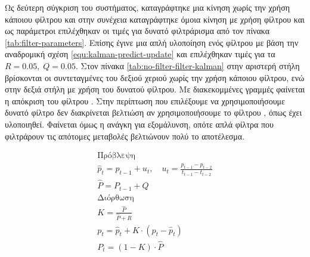 Ως δεύτερη σύγκριση του συστήματος, καταγράφτηκε μια κίνηση χωρίς την χρήση κάποιου φίλτρου και στην συνέχεια καταγράφτηκε όμοια κίνηση με χρήση φίλτρου και ως παράμετροι επιλέχθηκαν οι τιμές για δυνατό φιλτράρισμα από τον πίνακα \ref{tab:filter-parameters}. Επίσης έγινε μια απλή υλοποίηση ενός φίλτρου  με βάση την αναδρομική σχέση \ref{equ:kalman-predict-update} και επιλέχθηκαν τιμές για τα $R = 0.05,\; Q = 0.05$. Στον πίνακα \ref{tab:no-filter-filter-kalman} στην αριστερή στήλη βρίσκονται οι συντεταγμένες του δεξιού χεριού χωρίς την χρήση κάποιου φίλτρου, ενώ στην δεξιά στήλη με χρήση του δυνατού φίλτρου. Με διακεκομμένες γραμμές φαίνεται η απόκριση του φίλτρου . Στην περίπτωση που επιλέξουμε να χρησιμοποιήσουμε δυνατό φίλτρο δεν διακρίνεται βελτιώση αν χρησιμοποιήσουμε το φίλτρου , όπως έχει υλοποιηθεί. Φαίνεται όμως η ανάγκη για εξομάλυνση, οπότε απλά φίλτρα που φιλτράρουν τις απότομες μεταβολές βελτιώνουν πολύ το αποτέλεσμα.

\begin{equation}
    \begin{gathered}
        \text{Πρόβλεψη} \\
        \hat{p}_{t} = p_{t-1} + u_{t}, \quad u_{t} = \frac{p_{t-1} - p_{t-2}}{t_{t-1} - t_{t-2}} \\
        \hat{P} = P_{t-1} + Q \\[.5cm]
        \text{Διόρθωση} \\
        Κ = \frac{\hat{P}}{\hat{P} + R}\\
        p_{t} = \hat{p}_{t} + K \cdot (p_{t} - \hat{p}_{t}) \\
        P_{t} = (1 - K) \cdot \hat{P}
    \end{gathered}
    \label{equ:kalman-predict-update}
\end{equation}

